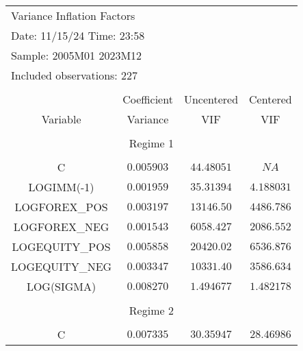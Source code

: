 \begin{tabular}{lrrr}
\multicolumn{2}{l}{Variance Inflation Factors}&\multicolumn{1}{c}{}&\multicolumn{1}{c}{}\\
\multicolumn{2}{l}{Date: 11/15/24   Time: 23:58}&\multicolumn{1}{c}{}&\multicolumn{1}{c}{}\\
\multicolumn{2}{l}{Sample: 2005M01 2023M12}&\multicolumn{1}{c}{}&\multicolumn{1}{c}{}\\
\multicolumn{2}{l}{Included observations: 227}&\multicolumn{1}{c}{}&\multicolumn{1}{c}{}\\
[4.5pt] \hline \\ [-4.5pt]
\multicolumn{1}{c}{}&\multicolumn{1}{c}{Coefficient}&\multicolumn{1}{c}{Uncentered}&\multicolumn{1}{c}{Centered}\\
\multicolumn{1}{c}{Variable}&\multicolumn{1}{c}{Variance}&\multicolumn{1}{c}{VIF}&\multicolumn{1}{c}{VIF}\\
[4.5pt] \hline \\ [-4.5pt]
\multicolumn{4}{c}{Regime 1}\\
[4.5pt] \hline \\ [-4.5pt]
\multicolumn{1}{c}{C}&\multicolumn{1}{c}{$0.005903$}&\multicolumn{1}{c}{$44.48051$}&\multicolumn{1}{c}{$NA$}\\
\multicolumn{1}{c}{LOGIMM(-1)}&\multicolumn{1}{c}{$0.001959$}&\multicolumn{1}{c}{$35.31394$}&\multicolumn{1}{c}{$4.188031$}\\
\multicolumn{1}{c}{LOGFOREX\_POS}&\multicolumn{1}{c}{$0.003197$}&\multicolumn{1}{c}{$13146.50$}&\multicolumn{1}{c}{$4486.786$}\\
\multicolumn{1}{c}{LOGFOREX\_NEG}&\multicolumn{1}{c}{$0.001543$}&\multicolumn{1}{c}{$6058.427$}&\multicolumn{1}{c}{$2086.552$}\\
\multicolumn{1}{c}{LOGEQUITY\_POS}&\multicolumn{1}{c}{$0.005858$}&\multicolumn{1}{c}{$20420.02$}&\multicolumn{1}{c}{$6536.876$}\\
\multicolumn{1}{c}{LOGEQUITY\_NEG}&\multicolumn{1}{c}{$0.003347$}&\multicolumn{1}{c}{$10331.40$}&\multicolumn{1}{c}{$3586.634$}\\
\multicolumn{1}{c}{LOG(SIGMA)}&\multicolumn{1}{c}{$0.008270$}&\multicolumn{1}{c}{$1.494677$}&\multicolumn{1}{c}{$1.482178$}\\
[4.5pt] \hline \\ [-4.5pt]
\multicolumn{4}{c}{Regime 2}\\
[4.5pt] \hline \\ [-4.5pt]
\multicolumn{1}{c}{C}&\multicolumn{1}{c}{$0.007335$}&\multicolumn{1}{c}{$30.35947$}&\multicolumn{1}{c}{$28.46986$}\\

\end{tabular}
